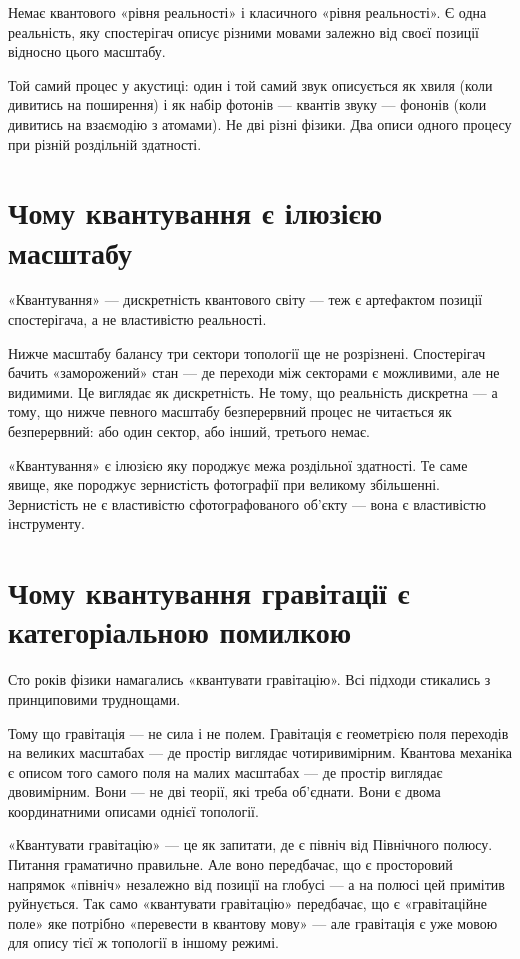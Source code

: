 \documentclass[12pt, a4paper, openany]{book}
\begin{document}
Немає квантового «рівня реальності» і класичного «рівня реальності». Є одна реальність, яку спостерігач описує різними мовами залежно від своєї позиції відносно цього масштабу.

\begin{analogybox}
Той самий процес у акустиці: один і той самий звук описується як хвиля (коли дивитись на поширення) і як набір фотонів --- квантів звуку --- фононів (коли дивитись на взаємодію з атомами). Не дві різні фізики. Два описи одного процесу при різній роздільній здатності.
\end{analogybox}

\section{Чому квантування є ілюзією масштабу}

«Квантування» --- дискретність квантового світу --- теж є артефактом позиції спостерігача, а не властивістю реальності.

Нижче масштабу балансу три сектори топології ще не розрізнені. Спостерігач бачить «заморожений» стан --- де переходи між секторами є можливими, але не видимими. Це виглядає як дискретність. Не тому, що реальність дискретна --- а тому, що нижче певного масштабу безперервний процес не читається як безперервний: або один сектор, або інший, третього немає.

«Квантування» є ілюзією яку породжує межа роздільної здатності. Те саме явище, яке породжує зернистість фотографії при великому збільшенні. Зернистість не є властивістю сфотографованого об'єкту --- вона є властивістю інструменту.

\section{Чому квантування гравітації є категоріальною помилкою}

Сто років фізики намагались «квантувати гравітацію». Всі підходи стикались з принциповими труднощами.

Тому що гравітація — не сила і не полем. Гравітація є геометрією поля переходів на великих масштабах --- де простір виглядає чотиривимірним. Квантова механіка є описом того самого поля на малих масштабах --- де простір виглядає двовимірним. Вони — не дві теорії, які треба об'єднати. Вони є двома координатними описами однієї топології.

«Квантувати гравітацію» --- це як запитати, де є північ від Північного полюсу. Питання граматично правильне. Але воно передбачає, що є просторовий напрямок «північ» незалежно від позиції на глобусі --- а на полюсі цей примітив руйнується. Так само «квантувати гравітацію» передбачає, що є «гравітаційне поле» яке потрібно «перевести в квантову мову» --- але гравітація є уже мовою для опису тієї ж топології в іншому режимі.
\end{document}
